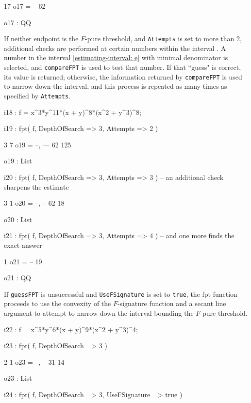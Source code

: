 \documentclass{amsart}
\begin{document}
{{\begin{MyVerbatim}
      17
o17 = --
      62

o17 : QQ

\end{MyVerbatim}
}

            If neither endpoint is the $F$-pure threshold, and {\tt Attempts} is set to more than 2, additional checks are performed at certain numbers within the interval .  A number in the interval \eqref{estimating-interval: e} with minimal denominator is selected, and {\tt compareFPT} is used to test that number. If that ``guess" is correct, its value is returned; otherwise, the information returned by {\tt compareFPT} is used to narrow down the interval, and this process is repeated as many times as specified by {\tt Attempts}.

{\small
{}
\begin{MyVerbatim}

i18 : f = x^3*y^11*(x + y)^8*(x^2 + y^3)^8;

i19 : fpt( f, DepthOfSearch => 3, Attempts => 2 )

        3   7
o19 = {--, ---}
       62  125

o19 : List

i20 : fpt( f, DepthOfSearch => 3, Attempts => 3 ) -- an additional check sharpens the estimate
 
        3   1
o20 = {--, --}
       62  18

o20 : List

i21 : fpt( f, DepthOfSearch => 3, Attempts => 4 ) -- and one more finds the exact answer

       1
o21 = --
      19

o21 : QQ

\end{MyVerbatim}
}


If {\tt guessFPT} is unsuccessful and {\tt UseFSignature} is set to {\tt true}, the fpt function proceeds to use the convexity of the $F$-signature function and a secant line argument to attempt to narrow down the interval bounding the $F$-pure threshold.

{\small
{}
\begin{MyVerbatim}

i22 : f = x^5*y^6*(x + y)^9*(x^2 + y^3)^4;

i23 : fpt( f, DepthOfSearch => 3 )

        2   1
o23 = {--, --}
       31  14

o23 : List

i24 : fpt( f, DepthOfSearch => 3, UseFSignature => true )


\end{MyVerbatim}}}
\end{document}
